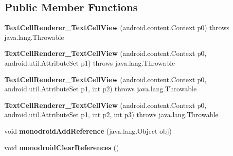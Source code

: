 \subsection*{Public Member Functions}
\begin{DoxyCompactItemize}
\item 
\mbox{\label{classmd5b60ffeb829f638581ab2bb9b1a7f4f3f_1_1_text_cell_renderer___text_cell_view_afe6c7e7e2a7fabcc9de2be5e1213ec39}} 
{\bfseries Text\+Cell\+Renderer\+\_\+\+Text\+Cell\+View} (android.\+content.\+Context p0)  throws java.\+lang.\+Throwable 	
\item 
\mbox{\label{classmd5b60ffeb829f638581ab2bb9b1a7f4f3f_1_1_text_cell_renderer___text_cell_view_ad18530bfd08906cd61bff0c0f121c982}} 
{\bfseries Text\+Cell\+Renderer\+\_\+\+Text\+Cell\+View} (android.\+content.\+Context p0, android.\+util.\+Attribute\+Set p1)  throws java.\+lang.\+Throwable 	
\item 
\mbox{\label{classmd5b60ffeb829f638581ab2bb9b1a7f4f3f_1_1_text_cell_renderer___text_cell_view_a4091a02a6c6480481b17fb51db97a2cc}} 
{\bfseries Text\+Cell\+Renderer\+\_\+\+Text\+Cell\+View} (android.\+content.\+Context p0, android.\+util.\+Attribute\+Set p1, int p2)  throws java.\+lang.\+Throwable 	
\item 
\mbox{\label{classmd5b60ffeb829f638581ab2bb9b1a7f4f3f_1_1_text_cell_renderer___text_cell_view_a19fd5743b7678bd5ed7a895ae1a015bc}} 
{\bfseries Text\+Cell\+Renderer\+\_\+\+Text\+Cell\+View} (android.\+content.\+Context p0, android.\+util.\+Attribute\+Set p1, int p2, int p3)  throws java.\+lang.\+Throwable 	
\item 
\mbox{\label{classmd5b60ffeb829f638581ab2bb9b1a7f4f3f_1_1_text_cell_renderer___text_cell_view_afc8a91c0d40ccce034289e75cb64e36a}} 
void {\bfseries monodroid\+Add\+Reference} (java.\+lang.\+Object obj)
\item 
\mbox{\label{classmd5b60ffeb829f638581ab2bb9b1a7f4f3f_1_1_text_cell_renderer___text_cell_view_a8a90317f45055f6bdc8b99196ff5d3c5}} 
void {\bfseries monodroid\+Clear\+References} ()
\end{DoxyCompactItemize}

